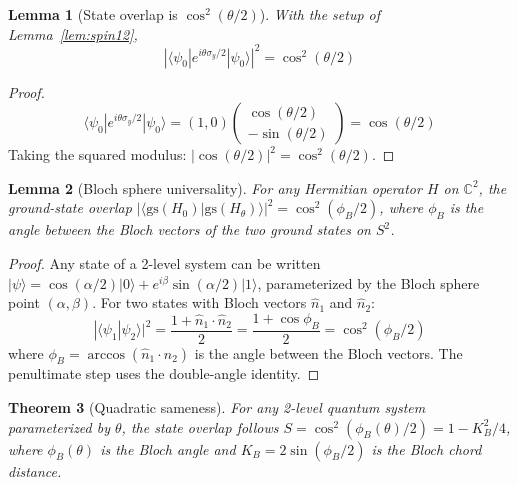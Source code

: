 \documentclass[11pt,letterpaper]{article}
\newtheorem{theorem}{Theorem}[section]
\newtheorem{lemma}[theorem]{Lemma}
\begin{document}
\begin{lemma}[State overlap is $\cos^2(\theta/2)$]\label{lem:overlap}
With the setup of Lemma~\ref{lem:spin12},
\begin{equation}
|\langle\psi_0|e^{i\theta\sigma_y/2}|\psi_0\rangle|^2 = \cos^2(\theta/2)
\end{equation}
\end{lemma}

\begin{proof}
\begin{equation}
\langle\psi_0|e^{i\theta\sigma_y/2}|\psi_0\rangle = (1, 0)\begin{pmatrix} \cos(\theta/2) \\ -\sin(\theta/2) \end{pmatrix} = \cos(\theta/2)
\end{equation}
Taking the squared modulus: $|\cos(\theta/2)|^2 = \cos^2(\theta/2)$.
\end{proof}

\begin{lemma}[Bloch sphere universality]\label{lem:bloch}
For \emph{any} Hermitian operator $H$ on $\mathbb{C}^2$, the ground-state overlap $|\langle\text{gs}(H_0)|\text{gs}(H_\theta)\rangle|^2 = \cos^2(\phi_B/2)$, where $\phi_B$ is the angle between the Bloch vectors of the two ground states on $S^2$.
\end{lemma}

\begin{proof}
Any state of a 2-level system can be written $|\psi\rangle = \cos(\alpha/2)|0\rangle + e^{i\beta}\sin(\alpha/2)|1\rangle$, parameterized by the Bloch sphere point $(\alpha, \beta)$. For two states with Bloch vectors $\hat{n}_1$ and $\hat{n}_2$:
\begin{equation}
|\langle\psi_1|\psi_2\rangle|^2 = \frac{1 + \hat{n}_1 \cdot \hat{n}_2}{2} = \frac{1 + \cos\phi_B}{2} = \cos^2(\phi_B/2)
\end{equation}
where $\phi_B = \arccos(\hat{n}_1 \cdot \hat{n}_2)$ is the angle between the Bloch vectors. The penultimate step uses the double-angle identity.
\end{proof}

\begin{theorem}[Quadratic sameness]\label{thm:quad}
For any 2-level quantum system parameterized by $\theta$, the state overlap follows $S = \cos^2(\phi_B(\theta)/2) = 1 - K_B^2/4$, where $\phi_B(\theta)$ is the Bloch angle and $K_B = 2\sin(\phi_B/2)$ is the Bloch chord distance.
\end{theorem}
\end{document}
